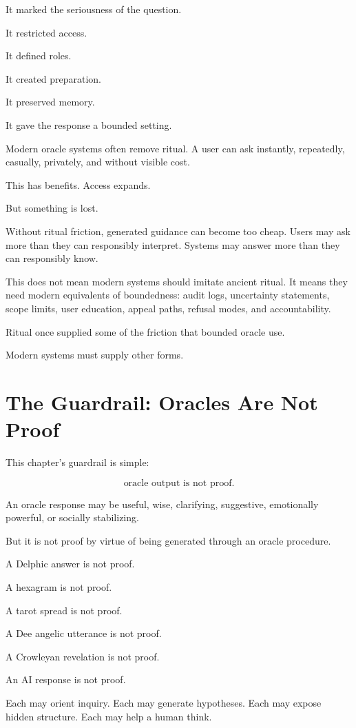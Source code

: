 \documentclass[11pt]{book}
\begin{document}
It marked the seriousness of the question.

It restricted access.

It defined roles.

It created preparation.

It preserved memory.

It gave the response a bounded setting.

Modern oracle systems often remove ritual. A user can ask instantly, repeatedly, casually, privately, and without visible cost.

This has benefits. Access expands.

But something is lost.

Without ritual friction, generated guidance can become too cheap. Users may ask more than they can responsibly interpret. Systems may answer more than they can responsibly know.

This does not mean modern systems should imitate ancient ritual. It means they need modern equivalents of boundedness: audit logs, uncertainty statements, scope limits, user education, appeal paths, refusal modes, and accountability.

Ritual once supplied some of the friction that bounded oracle use.

Modern systems must supply other forms.

\section{The Guardrail: Oracles Are Not Proof}

This chapter's guardrail is simple:

\[
\text{oracle output is not proof}.
\]

An oracle response may be useful, wise, clarifying, suggestive, emotionally powerful, or socially stabilizing.

But it is not proof by virtue of being generated through an oracle procedure.

A Delphic answer is not proof.

A hexagram is not proof.

A tarot spread is not proof.

A Dee angelic utterance is not proof.

A Crowleyan revelation is not proof.

An AI response is not proof.

Each may orient inquiry. Each may generate hypotheses. Each may expose hidden structure. Each may help a human think.
\end{document}
